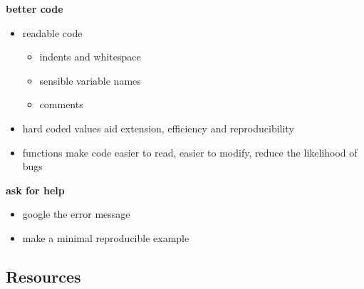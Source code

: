 \documentclass[
  12pt,
  a5paper,
]{book}
\providecommand{\tightlist}{%
  \setlength{\itemsep}{0pt}\setlength{\parskip}{0pt}}
\begin{document}
\textbf{better code}

\begin{itemize}
\tightlist
\item
  readable code

  \begin{itemize}
  \tightlist
  \item
    indents and whitespace
  \item
    sensible variable names
  \item
    comments
  \end{itemize}
\item
  hard coded values aid extension, efficiency and reproducibility
\item
  functions make code easier to read, easier to modify, reduce the likelihood of bugs
\end{itemize}

\textbf{ask for help}

\begin{itemize}
\tightlist
\item
  google the error message
\item
  make a minimal reproducible example
\end{itemize}

\hypertarget{resources-5}{%
\subsection{Resources}\label{resources-5}}
\end{document}
